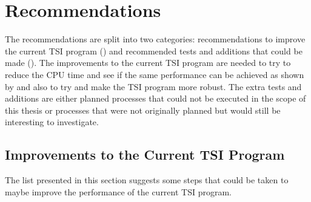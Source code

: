\section{Recommendations}
\label{sec:recommendations}
The recommendations are split into two categories: recommendations to improve the current \ac{TSI} program () and recommended tests and additions that could be made (). The improvements to the current \ac{TSI} program are needed to try to reduce the CPU time and see if the same performance can be achieved as shown by \cite{scott2008high,bergsma2016application} and also to try and make the \ac{TSI} program more robust. The extra tests and additions are either planned processes that could not be executed in the scope of this thesis or processes that were not originally planned but would still be interesting to investigate.

\subsection{Improvements to the Current \ac{TSI} Program}
\label{subsec:improvementsToTheCurrentTSIprogram}
The list presented in this section suggests some steps that could be taken to maybe improve the performance of the current \ac{TSI} program. 

